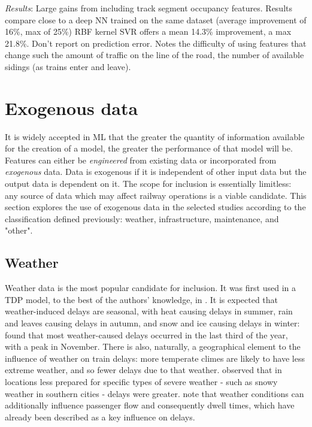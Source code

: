\documentclass{article}
\begin{document}
\smallskip

\textit{Results}: Large gains from including track segment occupancy features. Results compare close to a deep NN trained on the same dataset (average improvement of 16\%, max of 25\%)
RBF kernel SVR offers a mean 14.3\% improvement, a max 21.8\%. Don't report on prediction error. Notes the difficulty of using features that change such the amount of traffic on the line of the road, the number of available sidings (as trains enter and leave).

\clearpage
\section{Exogenous data}

It is widely accepted in ML that the greater the quantity of information available for the creation of a model, the greater the performance of that model will be. Features can either be \textit{engineered} from existing data or incorporated from \textit{exogenous} data. Data is exogenous if it is independent of other input data but the output data is dependent on it. The scope for inclusion is essentially limitless: any source of data which may affect railway operations is a viable candidate. This section explores the use of exogenous data in the selected studies according to the classification defined previously: weather, infrastructure, maintenance, and "other".

\subsection{Weather}

Weather data is the most popular candidate for inclusion. It was first used in a TDP model, to the best of the authors' knowledge, in \cite{oneto_et_al_2016}. It is expected that weather-induced delays are seasonal, with heat causing delays in summer, rain and leaves causing delays in autumn, and snow and ice causing delays in winter: \cite{brazil_2017} found that most weather-caused delays occurred in the last third of the year, with a peak in November. There is also, naturally, a geographical element to the influence of weather on train delays: more temperate climes are likely to have less extreme weather, and so fewer delays due to that weather. \cite{wang_et_al_2019} observed that in locations less prepared for specific types of severe weather - such as snowy weather in southern cities - delays were greater. \cite{oneto_et_al_2016} note that weather conditions can additionally influence passenger flow and consequently dwell times, which have already been described as a key influence on delays. 
\end{document}
